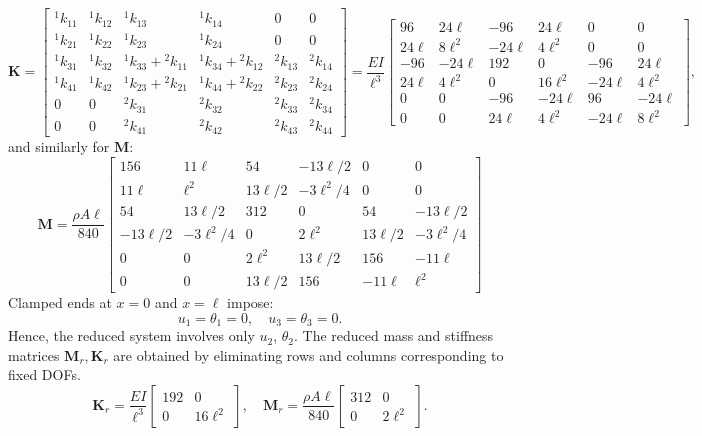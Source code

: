\documentclass[12pt]{article}
\begin{document}
\[
	\mathbf{K} =
	\begin{bmatrix}
		^{1}k_{11} & ^{1}k_{12} & ^{1}  k_{13}            & ^{1}k_{14}              & 0          & 0          \\
		^{1}k_{21} & ^{1}k_{22} & ^{1}k_{23}              & ^{1}k_{24}              & 0          & 0          \\
		^{1}k_{31} & ^{1}k_{32} & ^{1}k_{33}+{}^{2}k_{11} & ^{1}k_{34}+{}^{2}k_{12} & ^{2}k_{13} & ^{2}k_{14} \\
		^{1}k_{41} & ^{1}k_{42} & ^{1}k_{23}+{}^{2}k_{21} & ^{1}k_{44}+{}^{2}k_{22} & ^{2}k_{23} & ^{2}k_{24} \\
		0          & 0          & ^{2} k_{31}             & ^{2}k_{32}              & ^{2}k_{33} & ^{2}k_{34} \\
		0          & 0          & ^{2}k_{41}              & ^{2}k_{42}              & ^{2}k_{43} & ^{2}k_{44}
	\end{bmatrix}= \frac{EI}{\ell^3}\begin{bmatrix}
		96      & 24\ell   & -96     & 24\ell    & 0       & 0       \\
		24 \ell & 8 \ell^2 & -24\ell & 4\ell^2   & 0       & 0       \\
		-96     & -24\ell  & 192     & 0         & -96     & 24 \ell \\
		24\ell  & 4\ell^2  & 0       & 16 \ell^2 & -24\ell & 4\ell^2 \\
		0       & 0        & -96     & -24 \ell  & 96      & -24\ell \\
		0       & 0        & 24\ell  & 4\ell^2   & -24\ell & 8\ell^2
	\end{bmatrix},
\]
and similarly for \( \mathbf{M} \):
$$\mathbf{M} =\frac{\rho A\ell}{840}
	\begin{bmatrix}
		156       & 11\ell     & 54       & -13\ell/2  & 0        & 0          \\
		11\ell    & \ell^2     & 13\ell/2 & -3\ell^2/4 & 0        & 0          \\
		54        & 13\ell/2   & 312      & 0          & 54       & -13\ell/2  \\
		-13\ell/2 & -3\ell^2/4 & 0        & 2\ell^2    & 13\ell/2 & -3\ell^2/4 \\
		0         & 0          & 2\ell^2  & 13\ell/2   & 156      & -11\ell    \\
		0         & 0          & 13\ell/2 & 156        & -11\ell  & \ell^2
	\end{bmatrix}$$
Clamped ends at \( x=0 \) and \( x=\ell \) impose:
\[
	u_1 = \theta_1 = 0, \quad u_3 = \theta_3 = 0.
\]
Hence, the reduced system involves only \( u_2 \), \( \theta_2 \). The reduced mass and stiffness matrices \( \mathbf{M}_r, \mathbf{K}_r \) are obtained by eliminating rows and columns corresponding to fixed DOFs.
\[
	\mathbf{K}_r =  \frac{EI}{\ell^3}\begin{bmatrix}
		192 & 0        \\
		0   & 16\ell^2
	\end{bmatrix}, \quad
	\mathbf{M}_r = \frac{\rho A\ell}{840} \begin{bmatrix}
		312 & 0       \\
		0   & 2\ell^2
	\end{bmatrix}.
\]
\end{document}
